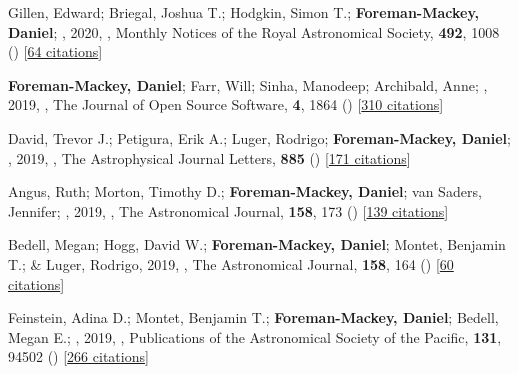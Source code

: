 \item[{\color{numcolor}\scriptsize52}] Gillen, Edward; Briegal, Joshua T.; Hodgkin, Simon T.; \textbf{Foreman-Mackey, Daniel}; \etal, 2020, , Monthly Notices of the Royal Astronomical Society, \textbf{492}, 1008 () [\href{https://ui.adsabs.harvard.edu/abs/2020MNRAS.492.1008G}{64 citations}]

\item[{\color{numcolor}\scriptsize51}] \textbf{Foreman-Mackey, Daniel}; Farr, Will; Sinha, Manodeep; Archibald, Anne; \etal, 2019, , The Journal of Open Source Software, \textbf{4}, 1864 () [\href{https://ui.adsabs.harvard.edu/abs/2019JOSS....4.1864F}{310 citations}]

\item[{\color{numcolor}\scriptsize50}] David, Trevor J.; Petigura, Erik A.; Luger, Rodrigo; \textbf{Foreman-Mackey, Daniel}; \etal, 2019, , The Astrophysical Journal Letters, \textbf{885} () [\href{https://ui.adsabs.harvard.edu/abs/2019ApJ...885L..12D}{171 citations}]

\item[{\color{numcolor}\scriptsize49}] Angus, Ruth; Morton, Timothy D.; \textbf{Foreman-Mackey, Daniel}; van Saders, Jennifer; \etal, 2019, , The Astronomical Journal, \textbf{158}, 173 () [\href{https://ui.adsabs.harvard.edu/abs/2019AJ....158..173A}{139 citations}]

\item[{\color{numcolor}\scriptsize48}] Bedell, Megan; Hogg, David W.; \textbf{Foreman-Mackey, Daniel}; Montet, Benjamin T.; \& Luger, Rodrigo, 2019, , The Astronomical Journal, \textbf{158}, 164 () [\href{https://ui.adsabs.harvard.edu/abs/2019AJ....158..164B}{60 citations}]

\item[{\color{numcolor}\scriptsize47}] Feinstein, Adina D.; Montet, Benjamin T.; \textbf{Foreman-Mackey, Daniel}; Bedell, Megan E.; \etal, 2019, , Publications of the Astronomical Society of the Pacific, \textbf{131}, 94502 () [\href{https://ui.adsabs.harvard.edu/abs/2019PASP..131i4502F}{266 citations}]


